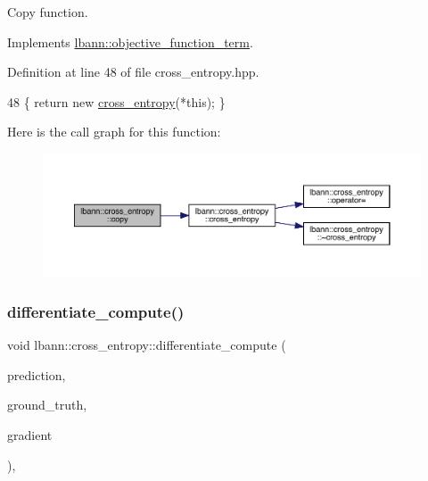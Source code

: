 Copy function. 

Implements \hyperlink{classlbann_1_1objective__function__term_ae98a4ec173a602ad55d1df20dadd4cb9}{lbann\+::objective\+\_\+function\+\_\+term}.



Definition at line 48 of file cross\+\_\+entropy.\+hpp.


\begin{DoxyCode}
48 \{ \textcolor{keywordflow}{return} \textcolor{keyword}{new} \hyperlink{classlbann_1_1cross__entropy_a68520e75b1613caa6e845b26199df0ee}{cross\_entropy}(*\textcolor{keyword}{this}); \}
\end{DoxyCode}
Here is the call graph for this function\+:\nopagebreak
\begin{figure}[H]
\begin{center}
\leavevmode
\includegraphics[width=350pt]{classlbann_1_1cross__entropy_a5d709e7cf0a3a260ba8d5c558aebda88_cgraph}
\end{center}
\end{figure}
\mbox{\label{classlbann_1_1cross__entropy_a5a91b6dac7d27980c47f6fd818963d1b}} 
\subsubsection{\texorpdfstring{differentiate\+\_\+compute()}{differentiate\_compute()}}
{\footnotesize\ttfamily void lbann\+::cross\+\_\+entropy\+::differentiate\+\_\+compute (\begin{DoxyParamCaption}\item[{const \hyperlink{base_8hpp_a9a697a504ae84010e7439ffec862b470}{Abs\+Dist\+Mat} \&}]{prediction,  }\item[{const \hyperlink{base_8hpp_a9a697a504ae84010e7439ffec862b470}{Abs\+Dist\+Mat} \&}]{ground\+\_\+truth,  }\item[{\hyperlink{base_8hpp_a9a697a504ae84010e7439ffec862b470}{Abs\+Dist\+Mat} \&}]{gradient }\end{DoxyParamCaption})\hspace{0.3cm}{\ttfamily [override]}, {\ttfamily [virtual]}}

